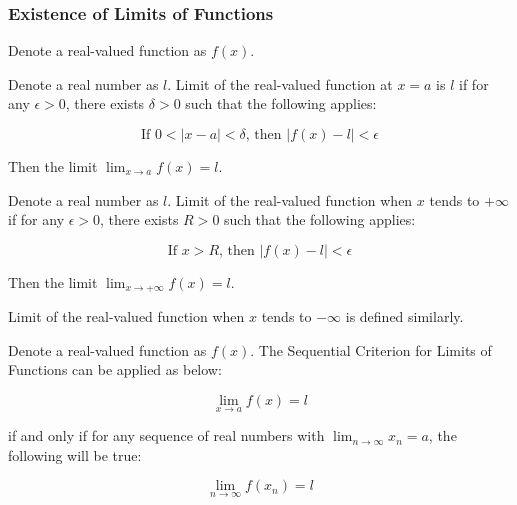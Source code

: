 \documentclass[a4paper,12pt]{article}
\begin{document}
\subsubsection{Existence of Limits of Functions}
\begin{thm}
  Denote a real-valued function as $f(x)$.
  \begin{alist}
    \item Denote a real number as $l$. Limit of the real-valued function at $x=a$ is $l$ if for any $\epsilon>0$, there exists $\delta>0$ such that the following applies:

    $$\text{If }0<\left| x-a\right| <\delta\text{, then }\left| f(x)-l\right| <\epsilon$$\s

    Then the limit $\lim_{x\to a}f(x)=l$.
    \item Denote a real number as $l$. Limit of the real-valued function when $x$ tends to $+\infty$ if for any $\epsilon>0$, there exists $R>0$ such that the following applies:

    $$\text{If }x>R\text{, then }\left| f(x)-l\right| <\epsilon$$\s

    Then the limit $\lim_{x\to +\infty}f(x)=l$.
  \end{alist}
\end{thm}\n

Limit of the real-valued function when $x$ tends to $-\infty$ is defined similarly.\n

\begin{thm}
  Denote a real-valued function as $f(x)$. The Sequential Criterion for Limits of Functions can be applied as below:

  $$\lim_{x\to a}f(x)=l$$\s

  if and only if for any sequence of real numbers with $\lim_{n\to \infty}x_{n}=a$, the following will be true:

  $$\lim_{n\to \infty}f(x_{n})=l$$
\end{thm}
\end{document}
